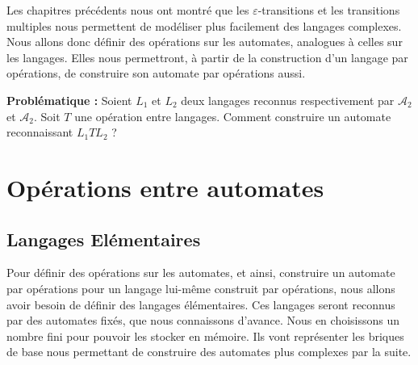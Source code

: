 

\minitoc %



Les chapitres précédents nous ont montré que les $\varepsilon$-transitions et les transitions multiples 
nous permettent de modéliser plus facilement des langages complexes. 
Nous allons donc définir des opérations sur les automates, analogues à celles sur les langages. 
Elles nous permettront, à partir de la construction d'un langage par opérations, de construire son automate par 
opérations aussi. 

\textbf{Problématique : } Soient $L_1$ et $L_2$ deux langages reconnus respectivement par $ \mathcal{A}_2$ et $ \mathcal{A}_2$. 
Soit $T$ une opération entre langages. Comment construire un automate reconnaissant $L_1 T L_2$ ? 


\section{Opérations entre automates}

\subsection{Langages Elémentaires}

Pour définir des opérations sur les automates, et ainsi, construire un automate par opérations pour un langage 
lui-même construit par opérations, nous allons avoir besoin de définir des langages élémentaires. 
Ces langages seront reconnus par des automates fixés, que nous connaissons d'avance. Nous en choisissons un nombre fini 
pour pouvoir les stocker en mémoire. Ils vont représenter les briques de base nous permettant de construire des automates plus 
complexes par la suite. 


